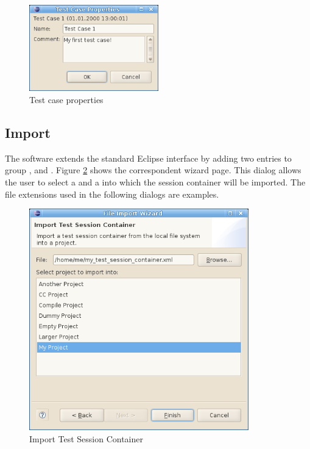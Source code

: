 \begin{figure}[hbtp]
 \centering
 \includegraphics[width=0.5\textwidth]{images/Test_Case_Administration_View/Test_Case_Properties.png}
 \caption{Test case properties}
 \label{ui_fg:Test case properties}
\end{figure}

\subsection{Import} \label{ui:Import}
The software extends the standard Eclipse  interface by adding two entries to group \eclui{\gbt},  and . Figure \ref{ui_fg:Import Test Session Container} shows the correspondent  wizard page. This dialog allows the user to select a  and a  into which the session container will be imported. The file extensions used in the following dialogs are examples.
\begin{figure}[hbtp]
 \centering
 \includegraphics[width=0.85\textwidth]{images/Test_Case_Administration_View/Import_Session.png}
 \caption{Import Test Session Container}
 \label{ui_fg:Import Test Session Container}
\end{figure}
